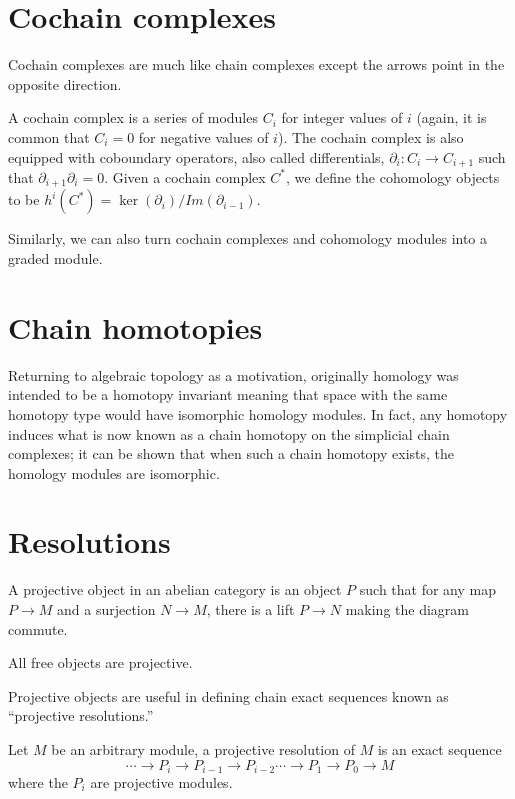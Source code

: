 \section{Cochain complexes}
Cochain complexes are much like chain complexes except the
arrows point in the
opposite direction.
\begin{definition} A cochain complex is a series of modules
$C_i$ for integer
values of $i$ (again, it is common that $C_i=0$ for negative
values of $i$). The
cochain complex is also equipped with coboundary operators, also
called
differentials, $\partial_i:C_i\rightarrow C_{i+1}$ such that
$\partial_{i+1}\partial_i=0$. Given a cochain complex $C^*$, we
define the
cohomology objects to be
$h^i(C^*)=\ker(\partial_i)/Im(\partial_{i-1})$.
\end{definition}
Similarly, we can also turn cochain complexes and cohomology
modules into a
graded module.

\section{Chain homotopies}
Returning to algebraic topology as a motivation, originally
homology was
intended to be a homotopy invariant meaning that space with the
same homotopy
type would have isomorphic homology modules. In fact, any
homotopy induces what
is now known as a chain homotopy on the simplicial chain
complexes; it can be
shown that when such a chain homotopy exists, the homology
modules are
isomorphic.

\section{Resolutions}

\begin{definition} A projective object in an abelian category is
an object $P$
such that for any map $P\rightarrow M$ and a surjection
$N\rightarrow M$, there
is a lift $P\rightarrow N$ making the diagram commute.
\end{definition}
\begin{example} All free objects are projective. \end{example}
Projective objects are useful in defining chain exact sequences
known as ``projective resolutions.''

\begin{definition} Let $M$ be an arbitrary module, a projective
resolution of
$M$ is an exact sequence
\begin{equation} \cdots\rightarrow P_i\rightarrow
P_{i-1}\rightarrow
P_{i-2}\cdots\rightarrow P_1\rightarrow P_0\rightarrow M
\end{equation} where
the $P_i$ are projective modules. \end{definition}


